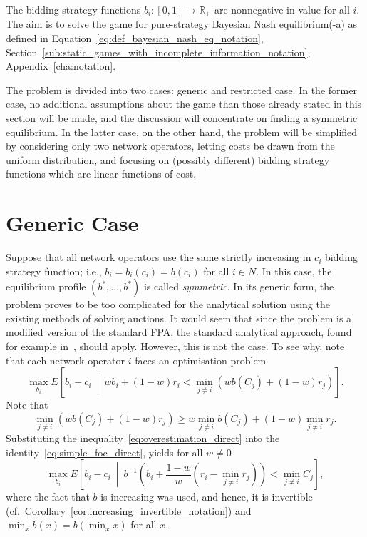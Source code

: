 The bidding strategy functions $b_i: [0,1]\to\mathbb{R_+}$ are nonnegative in value for all $i$. The aim is to solve the game for pure-strategy Bayesian Nash equilibrium(-a) as defined in Equation~\eqref{eq:def_bayesian_nash_eq_notation}, Section~\ref{sub:static_games_with_incomplete_information_notation}, Appendix~\ref{cha:notation}.

The problem is divided into two cases: generic and restricted case. In the former case, no additional assumptions about the game than those already stated in this section will be made, and the discussion will concentrate on finding a symmetric equilibrium. In the latter case, on the other hand, the problem will be simplified by considering only two network operators, letting costs be drawn from the uniform distribution, and focusing on (possibly different) bidding strategy functions which are linear functions of cost.

\section{Generic Case} %
\label{sec:direct_generic_case_direct}
Suppose that all network operators use the same strictly increasing in $c_i$ bidding strategy function; i.e., $b_i = b_i(c_i) = b(c_i)$ for all $i\in N$. In this case, the equilibrium profile $(b^*,\ldots,b^*)$ is called \emph{symmetric}. In its generic form, the problem proves to be too complicated for the analytical solution using the existing methods of solving auctions. It would seem that since the problem is a modified version of the standard FPA, the standard analytical approach, found for example in~\cite{Krishna10,McAfee1987,Hansen88,Dastidar08}, should apply. However, this is not the case. To see why, note that each network operator $i$ faces an optimisation problem
\begin{equation}
	\label{eq:simple_foc_direct}
	\max_{b_i}E\left[ b_i-c_i \:\middle\vert\: wb_i + (1-w)r_i < \displaystyle\min_{j\neq i}(wb(C_j) + (1-w)r_j) \right].
\end{equation}
Note that
\begin{equation}
	\label{eq:overestimation_direct}
	\displaystyle\min_{j\neq i}(wb(C_j) + (1-w)r_j) \ge w\displaystyle\min_{j\neq i}b(C_j) + (1-w)\displaystyle\min_{j\neq i}r_j.
\end{equation}
Substituting the inequality~\eqref{eq:overestimation_direct} into the identity~\eqref{eq:simple_foc_direct}, yields for all $w\neq 0$
\begin{equation}
	\max_{b_i}E\left[ b_i-c_i \:\middle\vert\: b^{-1}\left(b_i + \frac{1-w}{w}(r_i-\displaystyle\min_{j\neq i}r_j)\right) < \displaystyle\min_{j\neq i}C_j \right],
	\label{eq:ode_part1_direct}
\end{equation}
where the fact that $b$ is increasing was used, and hence, it is invertible (cf.~Corollary~\ref{cor:increasing_invertible_notation}) and $\min_{x}b(x) = b(\min_{x}x)$ for all $x$.

